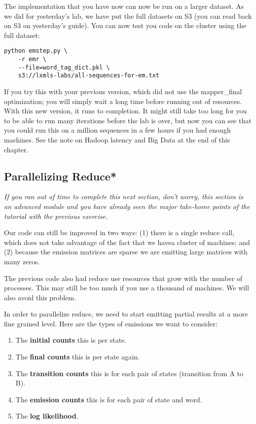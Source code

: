 The implementation that you have now can now be run on a larger dataset. As we
did for yesterday's lab, we have put the full datasets on S3 (you can read back
on S3 on yesterday's guide). You can now test you code on the cluster using the
full dataset:

\begin{verbatim}
python emstep.py \
    -r emr \
    --file=word_tag_dict.pkl \
    s3://lxmls-labs/all-sequences-for-em.txt
\end{verbatim}

If you try this with your previous version, which did not use the mapper\_final
optimization; you will simply wait a long time before running out of
resources. With this new version, it runs to completion. It might still take
too long for you to be able to run many iterations before the lab is over, but
now you can see that you could run this on a million sequences in a few hours
if you had enough machines. See the note on Hadoop latency and Big Data at the
end of this chapter.

\subsection{Parallelizing Reduce*}

\emph{If you ran out of time to complete this next section, don't worry, this
section is an advanced module and you have already seen the major take-home
points of the tutorial with the previous exercise.}

Our code can still be improved in two ways: (1) there is a single reduce call,
which does not take advantage of the fact that we havea cluster of machines;
and (2) because the emission matrices are sparse we are emitting large matrices
with many zeros. %

The previous code also had reduce use resources that grow with the number of
processes. This may still be too much if you use a thousand of machines. We
will also avoid this problem.

In order to parallelize reduce, we need to start emitting partial results at a
more fine grained level. Here are the types of emissions we want to consider:

\begin{enumerate}
\item The \textbf{initial counts} this is per state.
\item The \textbf{final counts} this is per state again.
\item The \textbf{transition counts} this is for each pair of states (transition from A to B).
\item The \textbf{emission counts} this is for each pair of state and word.
\item The \textbf{log likelihood}.
\end{enumerate}

